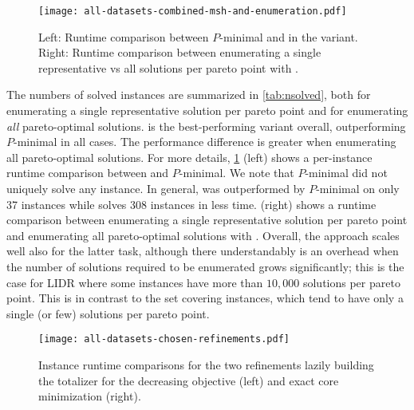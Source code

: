 \begin{figure}
    \centering
    \texttt{[image: all-datasets-combined-msh-and-enumeration.pdf]}
    \caption{Left: Runtime comparison between $P$-minimal and \algname{} in the \msh{} variant. %
      Right: Runtime comparison between enumerating a single representative vs all solutions per pareto point with \msh{}.
    }\label{fig:msh-scatter}
\end{figure}

The numbers of solved instances are summarized in \cref{tab:nsolved},
both for  enumerating a single representative solution per pareto point and for enumerating \emph{all} pareto-optimal solutions.
\msh{} is the best-performing \algname{} variant overall, outperforming $P$-minimal in all cases. The performance difference
is greater when enumerating all pareto-optimal solutions.
For more details,
\cref{fig:msh-scatter} (left) shows a per-instance runtime comparison between \msh{} and $P$-minimal.
We note that
$P$-minimal did not uniquely solve any instance. In general, \msh{} was outperformed by $P$-minimal on only 37 instances while \msh{} solves 308 instances in less time.
 (right) shows a runtime comparison between enumerating a single representative solution per pareto point and enumerating all pareto-optimal solutions with \msh{}.
 Overall, the approach scales well also for the latter task, although there understandably is an overhead 
  when the number of solutions required to be enumerated grows significantly; this is the case for
  LIDR
  where some instances
  have 
  more than $10,000$ solutions per pareto point.
This is in contrast to the set covering instances, which tend to have only a single (or few) solutions per pareto point.

\begin{figure}
    \centering
    \texttt{[image: all-datasets-chosen-refinements.pdf]}
    \caption{Instance runtime comparisons for the two refinements lazily building the totalizer for the decreasing objective (left) and exact core minimization (right).
      } \label{fig:refinements}
\end{figure}

